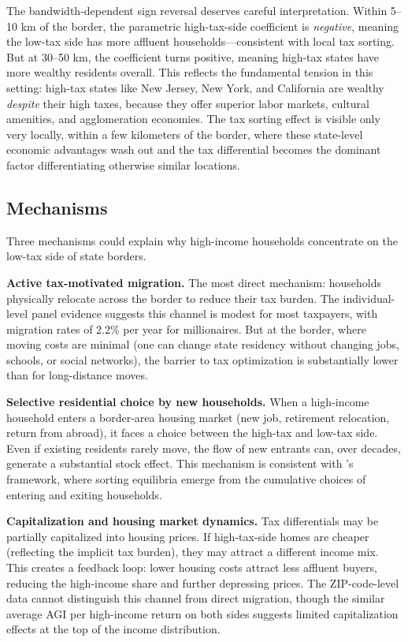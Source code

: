 \documentclass[12pt]{article}
\begin{document}
The bandwidth-dependent sign reversal deserves careful interpretation. Within 5--10 km of the border, the parametric high-tax-side coefficient is \textit{negative}, meaning the low-tax side has more affluent households---consistent with local tax sorting. But at 30--50 km, the coefficient turns positive, meaning high-tax states have more wealthy residents overall. This reflects the fundamental tension in this setting: high-tax states like New Jersey, New York, and California are wealthy \textit{despite} their high taxes, because they offer superior labor markets, cultural amenities, and agglomeration economies. The tax sorting effect is visible only very locally, within a few kilometers of the border, where these state-level economic advantages wash out and the tax differential becomes the dominant factor differentiating otherwise similar locations.

\subsection{Mechanisms}

Three mechanisms could explain why high-income households concentrate on the low-tax side of state borders.

\textbf{Active tax-motivated migration.} The most direct mechanism: households physically relocate across the border to reduce their tax burden. The individual-level panel evidence \citep{young2016millionaire} suggests this channel is modest for most taxpayers, with migration rates of 2.2\% per year for millionaires. But at the border, where moving costs are minimal (one can change state residency without changing jobs, schools, or social networks), the barrier to tax optimization is substantially lower than for long-distance moves.

\textbf{Selective residential choice by new households.} When a high-income household enters a border-area housing market (new job, retirement relocation, return from abroad), it faces a choice between the high-tax and low-tax side. Even if existing residents rarely move, the flow of new entrants can, over decades, generate a substantial stock effect. This mechanism is consistent with \citet{bayer2007general}'s framework, where sorting equilibria emerge from the cumulative choices of entering and exiting households.

\textbf{Capitalization and housing market dynamics.} Tax differentials may be partially capitalized into housing prices. If high-tax-side homes are cheaper (reflecting the implicit tax burden), they may attract a different income mix. This creates a feedback loop: lower housing costs attract less affluent buyers, reducing the high-income share and further depressing prices. The ZIP-code-level data cannot distinguish this channel from direct migration, though the similar average AGI per high-income return on both sides suggests limited capitalization effects at the top of the income distribution.
\end{document}
